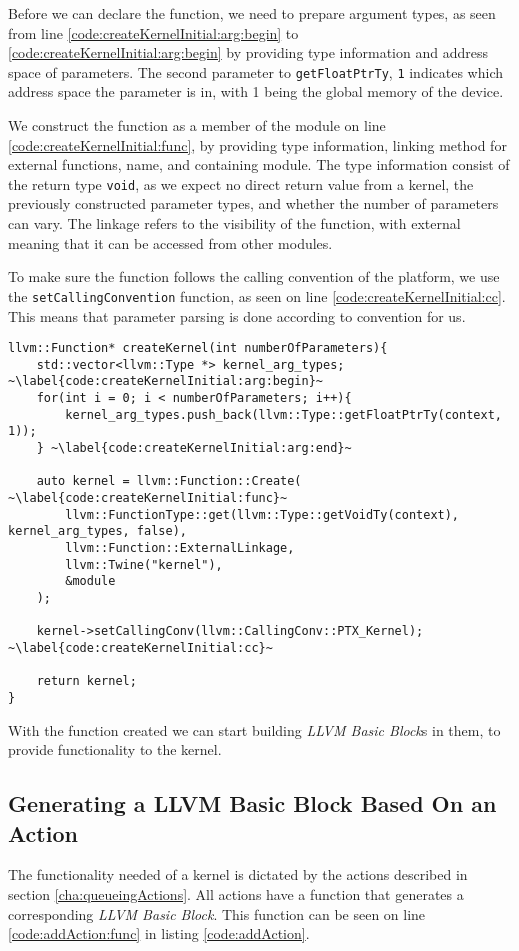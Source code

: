 Before we can declare the function, we need to prepare argument types, as seen from line \ref{code:createKernelInitial:arg:begin} to \ref{code:createKernelInitial:arg:begin} by providing type information and address space of parameters. The second parameter to \texttt{getFloatPtrTy}, \texttt{1} indicates which address space the parameter is in, with 1 being the global memory of the device.

We construct the function as a member of the module on line \ref{code:createKernelInitial:func}, by providing type information, linking method for external functions, name, and containing module. The type information consist of the return type \texttt{void}, as we expect no direct return value from a kernel, the previously constructed parameter types, and whether the number of parameters can vary. The linkage refers to the visibility of the function, with external meaning that it can be accessed from other modules.

To make sure the function follows the calling convention of the platform, we use the \texttt{setCallingConvention} function, as seen on line \ref{code:createKernelInitial:cc}. This means that parameter parsing is done according to convention for us.

\begin{lstlisting}[caption={The createKernel function}, label={code:createKernelInitial}]
llvm::Function* createKernel(int numberOfParameters){
    std::vector<llvm::Type *> kernel_arg_types; ~\label{code:createKernelInitial:arg:begin}~
    for(int i = 0; i < numberOfParameters; i++){
        kernel_arg_types.push_back(llvm::Type::getFloatPtrTy(context, 1));
    } ~\label{code:createKernelInitial:arg:end}~

    auto kernel = llvm::Function::Create( ~\label{code:createKernelInitial:func}~
        llvm::FunctionType::get(llvm::Type::getVoidTy(context), kernel_arg_types, false),
        llvm::Function::ExternalLinkage,
        llvm::Twine("kernel"),
        &module
    );

    kernel->setCallingConv(llvm::CallingConv::PTX_Kernel); ~\label{code:createKernelInitial:cc}~

    return kernel;
}
\end{lstlisting}

With the function created we can start building \textit{LLVM Basic Block}s in them, to provide functionality to the kernel.

\subsection{Generating a LLVM Basic Block Based On an Action} \label{sec:bbbuilding}
The functionality needed of a kernel is dictated by the actions described in section \ref{cha:queueingActions}. All actions have a function that generates a corresponding \textit{LLVM Basic Block}. This function can be seen on line \ref{code:addAction:func} in listing \ref{code:addAction}.

